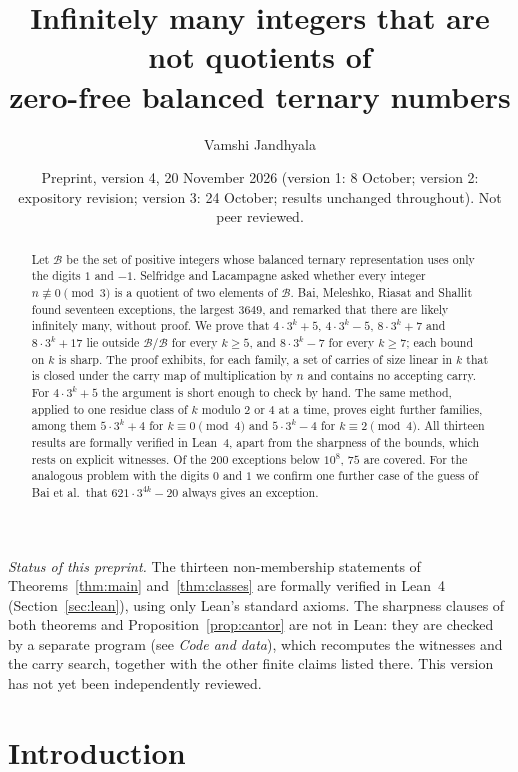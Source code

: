 \documentclass[11pt]{amsart}
\title[Quotients of zero-free balanced ternary numbers]{Infinitely many integers that are not quotients of\\ zero-free balanced ternary numbers}
\author{Vamshi Jandhyala}
\date{Preprint, version 4, 20 November 2026 (version 1: 8 October; version 2: expository revision; version 3: 24 October; results unchanged throughout). Not peer reviewed.}
\theoremstyle{definition}
\newcommand{\B}{\mathcal{B}}
\begin{document}
\begin{abstract}
Let $\B$ be the set of positive integers whose balanced ternary representation uses only the digits
$1$ and $-1$. Selfridge and Lacampagne asked whether every integer $n\not\equiv 0\pmod 3$ is a quotient
of two elements of $\B$. Bai, Meleshko, Riasat and Shallit found seventeen exceptions, the largest
$3649$, and remarked that there are likely infinitely many, without proof. We prove that $4\cdot 3^k+5$,
$4\cdot 3^k-5$, $8\cdot 3^k+7$ and $8\cdot 3^k+17$ lie outside $\B/\B$ for every $k\ge 5$, and
$8\cdot 3^k-7$ for every $k\ge 7$; each bound on $k$ is sharp. The proof exhibits, for each family, a
set of carries of size linear in $k$ that is closed under the carry map of multiplication by $n$ and
contains no accepting carry. For $4\cdot 3^k+5$ the argument is short enough to check by hand. The same method, applied
to one residue class of $k$ modulo $2$ or $4$ at a time, proves eight further families, among them
$5\cdot 3^k+4$ for $k\equiv 0\pmod 4$ and $5\cdot 3^k-4$ for $k\equiv 2\pmod 4$. All thirteen results
are formally verified in Lean~4, apart from the sharpness of the bounds, which rests on explicit witnesses. Of the $200$ exceptions below $10^8$, $75$ are covered. For the analogous problem with the digits $0$ and $1$ we confirm one
further case of the guess of Bai et al.\ that $621\cdot 3^{4k}-20$ always gives an exception.
\end{abstract}

\maketitle

\noindent\emph{Status of this preprint.} The thirteen non-membership statements of Theorems~\ref{thm:main} and~\ref{thm:classes} are formally verified in Lean~4 (Section~\ref{sec:lean}), using only Lean's standard axioms. The sharpness clauses of both theorems and Proposition~\ref{prop:cantor} are not in Lean: they are checked by a separate program (see \emph{Code and data}), which recomputes the witnesses and the carry search, together with the other finite claims listed there. This version has not yet been independently reviewed.

\section{Introduction}
\end{document}
